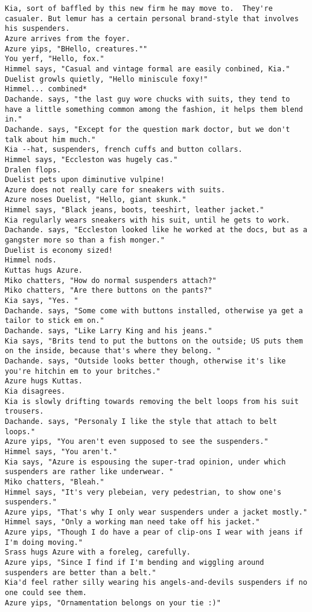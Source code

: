 \begin{verbatim}
Kia, sort of baffled by this new firm he may move to.  They're casualer. But lemur has a certain personal brand-style that involves his suspenders.
Azure arrives from the foyer.
Azure yips, "BHello, creatures.""
You yerf, "Hello, fox."
Himmel says, "Casual and vintage formal are easily conbined, Kia."
Duelist growls quietly, "Hello miniscule foxy!"
Himmel... combined*
Dachande. says, "the last guy wore chucks with suits, they tend to have a little something common among the fashion, it helps them blend in."
Dachande. says, "Except for the question mark doctor, but we don't talk about him much."
Kia --hat, suspenders, french cuffs and button collars.
Himmel says, "Eccleston was hugely cas."
Dralen flops.
Duelist pets upon diminutive vulpine!
Azure does not really care for sneakers with suits.
Azure noses Duelist, "Hello, giant skunk."
Himmel says, "Black jeans, boots, teeshirt, leather jacket."
Kia regularly wears sneakers with his suit, until he gets to work.
Dachande. says, "Eccleston looked like he worked at the docs, but as a gangster more so than a fish monger."
Duelist is economy sized!
Himmel nods.
Kuttas hugs Azure.
Miko chatters, "How do normal suspenders attach?"
Miko chatters, "Are there buttons on the pants?"
Kia says, "Yes. "
Dachande. says, "Some come with buttons installed, otherwise ya get a tailor to stick em on."
Dachande. says, "Like Larry King and his jeans."
Kia says, "Brits tend to put the buttons on the outside; US puts them on the inside, because that's where they belong. "
Dachande. says, "Outside looks better though, otherwise it's like you're hitchin em to your britches."
Azure hugs Kuttas.
Kia disagrees.
Kia is slowly drifting towards removing the belt loops from his suit trousers.
Dachande. says, "Personaly I like the style that attach to belt loops."
Azure yips, "You aren't even supposed to see the suspenders."
Himmel says, "You aren't."
Kia says, "Azure is espousing the super-trad opinion, under which suspenders are rather like underwear. "
Miko chatters, "Bleah."
Himmel says, "It's very plebeian, very pedestrian, to show one's suspenders."
Azure yips, "That's why I only wear suspenders under a jacket mostly."
Himmel says, "Only a working man need take off his jacket."
Azure yips, "Though I do have a pear of clip-ons I wear with jeans if I'm doing moving."
Srass hugs Azure with a foreleg, carefully.
Azure yips, "Since I find if I'm bending and wiggling around suspenders are better than a belt."
Kia'd feel rather silly wearing his angels-and-devils suspenders if no one could see them.
Azure yips, "Ornamentation belongs on your tie :)"

\end{verbatim}
